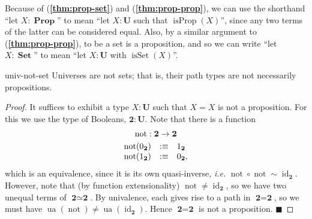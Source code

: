 \documentclass{article}
\renewcommand{\qed}{\hfill{\color{MPBthm}\( \blacksquare \)}}
\newcommand{\eql}{\mathbin{:\equiv}}
\newcommand{\U}{\mathbf{U}}
\newcommand{\1}{\textbf{1}}
\newcommand{\0}{\mathbf{0}}
\newcommand{\2}{\textbf{2}}
\DeclareMathOperator{\id}{id}
\DeclareMathOperator{\ua}{ua}
\DeclareMathOperator{\isProp}{isProp}
\DeclareMathOperator{\isSet}{isSet}
\DeclareMathOperator{\Prop}{\textbf{Prop}}
\DeclareMathOperator{\Set}{\textbf{Set}}
\DeclareMathOperator{\noot}{not}
\begin{document}
Because of (\textbf{\color{MPBthm}\ref{thm:prop-set}}) and (\textbf{\color{MPBthm}\ref{thm:prop-prop}}), we can use the shorthand ``let \( X : \Prop \)'' to mean ``let \( X : \U \) such that \( \isProp(X) \)'', since any two terms of the latter can be considered equal. Also, by a similar argument to (\textbf{\color{MPBthm}\ref{thm:prop-prop}}), to be a set is a proposition, and so we can write ``let \( X : \Set \)'' to mean ``let \( X : \U \) with \( \isSet(X) \)''.
\begin{thm}{}{univ-not-set} Universes are not sets; that is, their path types are not necessarily propositions.
\begin{proof}
	It suffices to exhibit a type \( X : \U \) such that \( X = X \) is not a proposition. For this we use the type of Booleans, \( \2 : \U \). Note that there is a function
	\[ \begin{array}{rcl}
		\multicolumn{3}{c}{\noot : \2 \to \2} \\[3pt]
		\noot(0_{\2}) &\eql& 1_{\2} \\
		\noot(1_{\2}) &\eql& 0_{\2},
	\end{array} \]
	which is an equivalence, since it is its own quasi-inverse, \emph{i.e.} \( \noot \circ \noot \sim \id_{\2} \). However, note that (by function extensionality) \( \noot \neq \id_{\2} \), so we have two unequal terms of \( \2 \simeq \2 \). By univalence, each gives rise to a path in \( \2 = \2 \), so we must have \( \ua(\noot) \neq \ua(\id_{\2}) \). Hence \( \2 = \2 \) is not a proposition. \qed
\end{proof} \end{thm}
\end{document}
